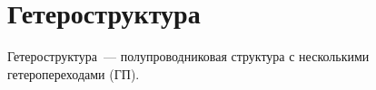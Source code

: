 





\section{Гетероструктура}
Гетероструктура~--- полупроводниковая структура с несколькими гетеропереходами (ГП). 


